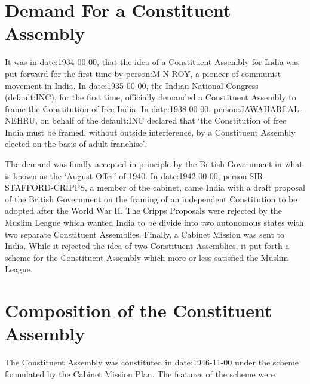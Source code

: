 \begin{multicols}{2}

\section{Demand For a Constituent Assembly}

It was in \gls{date:1934-00-00}, that the idea of a Constituent Assembly for India was put forward for the first time by \gls{person:M-N-ROY}, a pioneer of communist movement in India. In \gls{date:1935-00-00}, the Indian National Congress (\gls{default:INC}), for the first time, officially demanded a Constituent Assembly to frame the Constitution of free India. In \gls{date:1938-00-00}, \gls{person:JAWAHARLAL-NEHRU}, on behalf of the \gls{default:INC} declared that `the Constitution of free India must be framed, without outside interference, by a Constituent Assembly elected on the basis of adult franchise'.

The demand was finally accepted in principle by the British Government in what is known as the `August Offer' of 1940. In \gls{date:1942-00-00}, \gls{person:SIR-STAFFORD-CRIPPS}, a member of the cabinet, came India with a draft proposal of the British Government on the framing of an independent Constitution to be adopted after the World War II. The Cripps Proposals were rejected by the Muslim League which wanted India to be divide into two autonomous states with two separate Constituent Assemblies. Finally, a Cabinet Mission was sent to India. While it rejected the idea of two Constituent Assemblies, it put forth a scheme for the Constituent Assembly which more or less satisfied the Muslim League.

\section{Composition of the Constituent Assembly}

The Constituent Assembly was constituted in \gls{date:1946-11-00} under the scheme formulated by the Cabinet Mission Plan. The features of the scheme were


\end{multicols}
